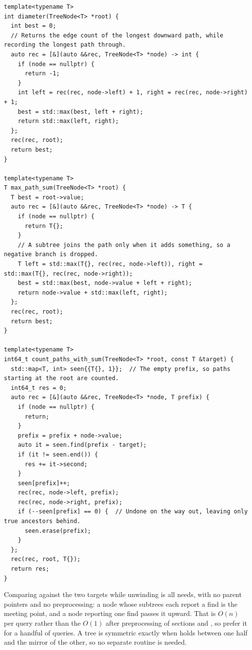 \begin{lstlisting}[style=cpp]
template<typename T>
int diameter(TreeNode<T> *root) {
  int best = 0;
  // Returns the edge count of the longest downward path, while recording the longest path through.
  auto rec = [&](auto &&rec, TreeNode<T> *node) -> int {
    if (node == nullptr) {
      return -1;
    }
    int left = rec(rec, node->left) + 1, right = rec(rec, node->right) + 1;
    best = std::max(best, left + right);
    return std::max(left, right);
  };
  rec(rec, root);
  return best;
}

template<typename T>
T max_path_sum(TreeNode<T> *root) {
  T best = root->value;
  auto rec = [&](auto &&rec, TreeNode<T> *node) -> T {
    if (node == nullptr) {
      return T{};
    }
    // A subtree joins the path only when it adds something, so a negative branch is dropped.
    T left = std::max(T{}, rec(rec, node->left)), right = std::max(T{}, rec(rec, node->right));
    best = std::max(best, node->value + left + right);
    return node->value + std::max(left, right);
  };
  rec(rec, root);
  return best;
}

template<typename T>
int64_t count_paths_with_sum(TreeNode<T> *root, const T &target) {
  std::map<T, int> seen{{T{}, 1}};  // The empty prefix, so paths starting at the root are counted.
  int64_t res = 0;
  auto rec = [&](auto &&rec, TreeNode<T> *node, T prefix) {
    if (node == nullptr) {
      return;
    }
    prefix = prefix + node->value;
    auto it = seen.find(prefix - target);
    if (it != seen.end()) {
      res += it->second;
    }
    seen[prefix]++;
    rec(rec, node->left, prefix);
    rec(rec, node->right, prefix);
    if (--seen[prefix] == 0) {  // Undone on the way out, leaving only true ancestors behind.
      seen.erase(prefix);
    }
  };
  rec(rec, root, T{});
  return res;
}
\end{lstlisting}
Comparing against the two targets while unwinding is all  needs, with no parent pointers and no preprocessing: a node whose subtrees each report a find is the meeting point, and a node reporting one find passes it upward. That is $O(n)$ per query rather than the $O(1)$ after preprocessing of sections  and , so prefer it for a handful of queries. A tree is symmetric exactly when  holds between one half and the mirror of the other, so no separate routine is needed.

